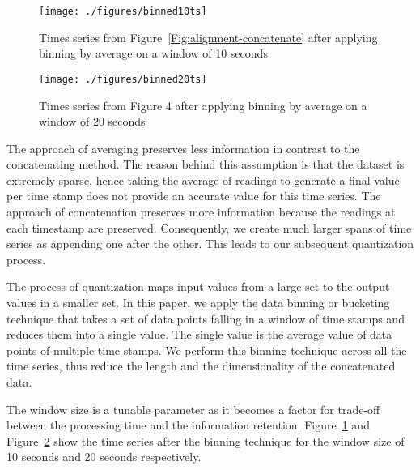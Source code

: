 \begin{figure}
	\centering
	\texttt{[image: ./figures/binned10ts]}
	\caption{Times series from Figure~\ref{Fig:alignment-concatenate} after applying binning by average on a window of 10 seconds}
	\label{Fig:binning-10}
\end{figure}

\begin{figure}
	\centering
	\texttt{[image: ./figures/binned20ts]}
	\caption{Times series from Figure 4 after applying binning by average on a window of 20 seconds}
	\label{Fig:binning-20}
\end{figure}


The approach of averaging preserves less information in contrast to the concatenating method. The reason behind this assumption is that the dataset is extremely sparse, hence taking the average of readings to generate a final value per time stamp does not provide an accurate value for this time series. The approach of concatenation preserves more information because the readings at each timestamp are preserved. Consequently, we create much larger spans of time series as appending one after the other. This leads to our subsequent quantization process. 

The process of quantization maps input values from a large set to the output values in a smaller set. In this paper, we apply the data binning or bucketing technique that takes a set of data points falling in a window of time stamps and reduces them into a single value. The single value is the average value of data points of multiple time stamps.  We perform this binning technique across all the time series, thus reduce the length and the dimensionality of the concatenated data.  

The window size is a tunable parameter as it becomes a factor for trade-off between the processing time and the information retention. Figure~\ref{Fig:binning-10} and Figure~\ref{Fig:binning-20} show the time series after the binning technique for the window size of 10 seconds and 20 seconds respectively. 
